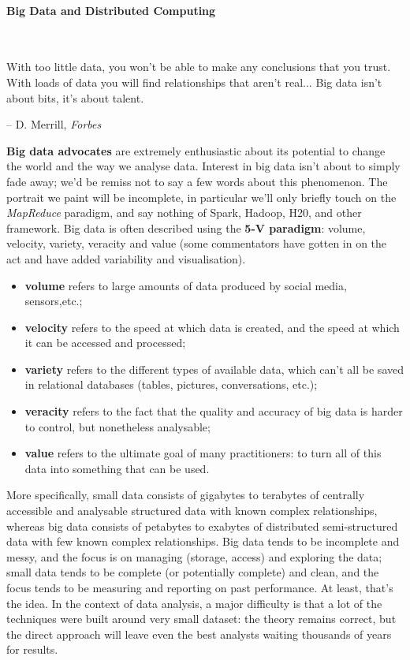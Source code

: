 \paragraph{Big Data and Distributed Computing}\ \newline
\begin{tcolorbox}[title=Smokes and Mirrors]
With too little data, you won't be able to make any conclusions that you trust.  With loads of data you will find relationships that aren't real... Big data isn't about bits, it's about talent. \\[-0.6cm]
\begin{flushright}
-- D. Merrill, \textit{Forbes}
\end{flushright}
\end{tcolorbox}
\noindent \textbf{Big data advocates} are extremely enthusiastic about its potential to change the world and the way we analyse data. Interest in big data isn't about to simply fade away; we'd be remiss not to say a few words about this phenomenon. The portrait we paint will be incomplete, in particular we'll only briefly touch on the \textit{MapReduce} paradigm, and say nothing of Spark, Hadoop, H20, and other framework. \newl Big data is often described using the \textbf{5-V paradigm}: volume, velocity, variety, veracity and value (some commentators have gotten in on the act and have added variability and visualisation).  
\begin{itemize}[noitemsep]
\item \textbf{volume} refers to large amounts of data produced by social media, sensors,etc.;
\item \textbf{velocity} refers to the speed at which data is created, and the speed at which it can be accessed and processed; 
\item \textbf{variety} refers to the different types of available data, which can't all be saved in relational databases (tables, pictures, conversations, etc.);
\item \textbf{veracity} refers to the fact that the quality and accuracy of big data is harder to control, but nonetheless analysable; 
\item \textbf{value} refers to the ultimate goal of many practitioners: to turn all of this data into something that can be used. 
\end{itemize}
More specifically, small data consists of gigabytes to terabytes of centrally accessible and analysable  structured data with known complex relationships, whereas big data consists of petabytes to exabytes of distributed semi-structured data with few known complex relationships. Big data tends to be incomplete and messy, and the focus is on managing (storage, access) and exploring the data; small data tends to be complete (or potentially complete) and clean, and the focus tends to be measuring and reporting on past performance. \newl At least, that's the idea. In the context of  data analysis, a major difficulty is that a lot of the techniques were built around very small dataset: the theory remains correct, but the direct approach will leave even the best analysts waiting thousands of years for results. \par
